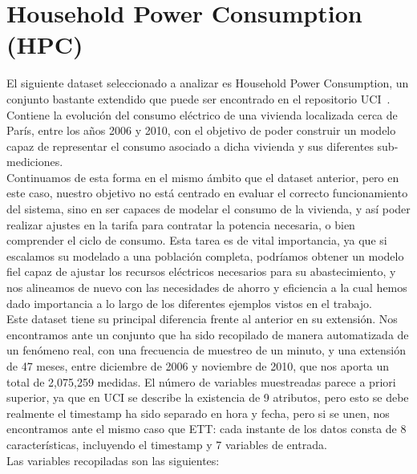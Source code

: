 \section{Household Power Consumption (HPC)}

El siguiente dataset seleccionado a analizar es Household Power Consumption, un conjunto bastante extendido que puede ser encontrado en el repositorio UCI~\cite{hebrail2006individual}. Contiene la evolución del consumo eléctrico de una vivienda localizada cerca de París, entre los años 2006 y 2010, con el objetivo de poder construir un modelo capaz de representar el consumo asociado a dicha vivienda y sus diferentes sub-mediciones.\\

Continuamos de esta forma en el mismo ámbito que el dataset anterior, pero en este caso, nuestro objetivo no está centrado en evaluar el correcto funcionamiento del sistema, sino en ser capaces de modelar el consumo de la vivienda, y así poder realizar ajustes en la tarifa para contratar la potencia necesaria, o bien comprender el ciclo de consumo. Esta tarea es de vital importancia, ya que si escalamos su modelado a una población completa, podríamos obtener un modelo fiel capaz de ajustar los recursos eléctricos necesarios para su abastecimiento, y nos alineamos de nuevo con las necesidades de ahorro y eficiencia a la cual hemos dado importancia a lo largo de los diferentes ejemplos vistos en el trabajo.\\

Este dataset tiene su principal diferencia frente al anterior en su extensión. Nos encontramos ante un conjunto que ha sido recopilado de manera automatizada de un fenómeno real, con una frecuencia de muestreo de un minuto, y una extensión de 47 meses, entre diciembre de 2006 y noviembre de 2010, que nos aporta un total de 2,075,259 medidas. El número de variables muestreadas parece a priori superior, ya que en UCI se describe la existencia de 9 atributos, pero esto se debe realmente el timestamp ha sido separado en hora y fecha, pero si se unen, nos encontramos ante el mismo caso que ETT: cada instante de los datos consta de 8 características, incluyendo el timestamp y 7 variables de entrada.\\

Las variables recopiladas son las siguientes:

